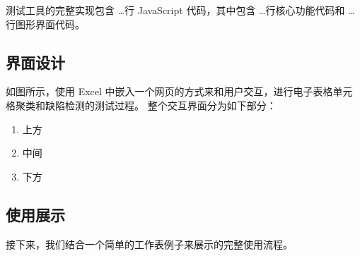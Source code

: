 \eg 测试工具的完整实现包含 \dots 行 JavaScript 代码，其中包含 \dots 行核心功能代码和 \dots 行图形界面代码。

\subsection{界面设计}

如图所示，\eg 使用 Excel 中嵌入一个网页的方式来和用户交互，进行电子表格单元格聚类和缺陷检测的测试过程。
整个交互界面分为如下部分：
\begin{enumerate}
    \item 上方 
    \item 中间 
    \item 下方 
\end{enumerate}

\subsection{使用展示}

接下来，我们结合一个简单的工作表例子来展示\eg 的完整使用流程。